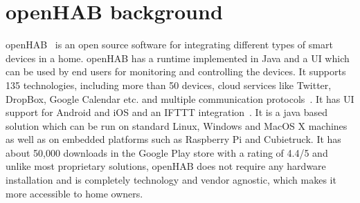\documentclass{sig-alternate-05-2015}
\begin{document}
\section{\MakeLowercase{open}HAB background}
openHAB~\cite{openhab} is an open source software for integrating different types of smart devices in a home. openHAB has a runtime implemented in Java and a UI which can be used by end users for monitoring and controlling the devices. It supports 135 technologies, including more than 50 devices, cloud services like Twitter, DropBox, Google Calendar etc. and multiple communication protocols~\cite{openhabtech}. It has UI support for Android and iOS and an IFTTT integration~\cite{ifttt}. It is a java based solution which can be run on standard Linux, Windows and MacOS X machines as well as on embedded platforms such as Raspberry Pi and Cubietruck. It has about 50,000 downloads in the Google Play store with a rating of 4.4/5 and unlike most proprietary solutions, openHAB does not require any hardware installation and is completely technology and vendor agnostic, which makes it more accessible to home owners. 
\end{document}
